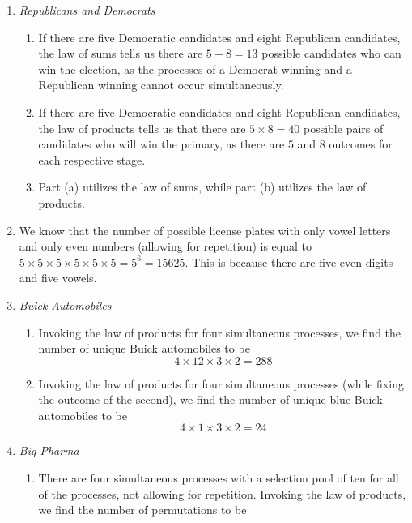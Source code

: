 \documentclass[a4paper,12pt]{article}
\theoremstyle{definition}
\theoremstyle{remark}
\begin{document}
\begin{enumerate}
    \item \textit{Republicans and Democrats}
    \begin{enumerate}
        \item If there are five Democratic candidates and eight Republican candidates, the law of sums tells us there are $5+8=13$ possible candidates who can win the election, as the processes of a Democrat winning and a Republican winning cannot occur simultaneously. %
        \item If there are five Democratic candidates and eight Republican candidates, the law of products tells us that there are $5\times 8=40$ possible pairs of candidates who will win the primary, as there are $5$ and $8$ outcomes for each respective stage. %
        \item  Part (a) utilizes the law of sums, while part (b) utilizes the law of products.
    \end{enumerate}
\item We know that the number of possible license plates with only vowel letters and only even numbers (allowing for repetition) is equal to $5\times5\times5\times5\times5\times5=5^6=15625$. This is because there are five even digits and five vowels. %
\item \textit{Buick Automobiles}
\begin{enumerate}
    \item Invoking the law of products for four simultaneous processes, we find the number of unique Buick automobiles to be \begin{equation*}
        4\times12\times3\times2=288
    \end{equation*} %
    \item Invoking the law of products for four simultaneous processes (while fixing the outcome of the second), we find the number of unique blue Buick automobiles to be\begin{equation*}
        4\times1\times3\times2=24
    \end{equation*}
\end{enumerate}
\item \textit{Big Pharma}
\begin{enumerate}
    \item There are four simultaneous processes with a selection pool of ten for all of the processes, not allowing for repetition. Invoking the law of products, we find the number of permutations to be \begin{equation*} 

\end{equation*}
\end{enumerate}
\end{enumerate}
\end{document}
